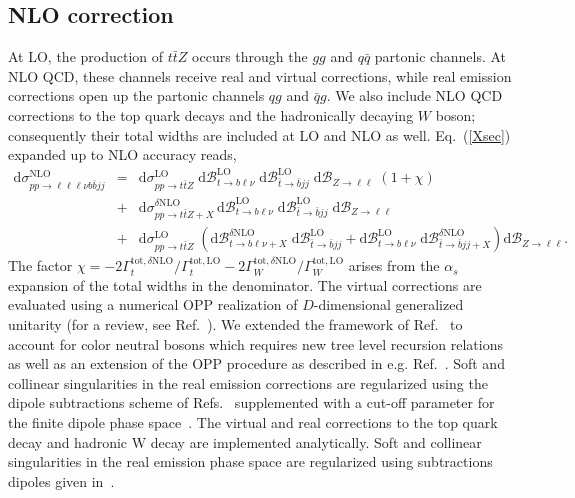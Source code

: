 \documentclass[preprint]{JHEP3} %
\newcommand{\mrm}{\mathrm}
\newcommand{\rd}{\mathrm{d}}
\newcommand{\Br}{\mathcal{B}}
\def\ttbZ{t\bar{t}Z}
\newcommand{\be}{\begin{eqnarray}}
\newcommand{\ee}{\end{eqnarray}}
\begin{document}
\subsection{NLO correction}
At LO, the production of $\ttbZ$ occurs through the $gg$ and $q\bar{q}$ partonic channels. 
At NLO QCD, these channels receive real and virtual corrections, while real emission corrections open up the partonic channels $qg$ and $\bar{q}g$. 
We also include NLO QCD corrections to the top quark decays and the hadronically decaying $W$ boson; consequently their total widths are included at LO and NLO as well.
Eq.~(\ref{Xsec}) expanded up to NLO accuracy reads,
\be
 \rd \sigma_{pp\to\ell\ell\ell\nu b \bar{b} jj}^\mrm{NLO} &=& 
 \rd \sigma_{pp\to\ttbZ}^\mrm{LO} \; \rd\Br_{t\to b \ell\nu}^\mrm{LO} \; \rd\Br_{\bar{t} \to \bar{b} jj}^\mrm{LO} \; \rd\Br_{Z\to \ell\ell}
 \; \left( 1 + \chi \right)
\nonumber \\
 &+&   \rd \sigma_{pp\to\ttbZ+X}^{\delta \mrm{NLO}}  \, \rd\Br_{t\to b \ell\nu}^\mrm{LO} \; \rd\Br_{\bar{t} \to \bar{b} jj}^\mrm{LO} \; \rd\Br_{Z\to \ell\ell}
\nonumber \\
 &+&  \rd \sigma_{pp\to\ttbZ}^\mrm{LO} \; \left(  \rd\Br_{t\to b \ell\nu+X}^{\delta\mrm{NLO}} \; \rd\Br_{\bar{t} \to \bar{b} jj}^\mrm{LO} + \rd\Br_{t\to b \ell\nu}^\mrm{LO} \; \rd\Br_{\bar{t} \to \bar{b} jj+X}^{\delta\mrm{NLO}} \right) \rd\Br_{Z\to \ell\ell}
. \label{XsecNLO}
\ee
The factor $\chi= -2 \Gamma_t^{\mrm{tot},\delta\mrm{NLO}}/\Gamma_t^{\mrm{tot,LO}} -2 \Gamma_W^{\mrm{tot},\delta\mrm{NLO}}/\Gamma_W^{\mrm{tot,LO}} $ arises from the $\alpha_s$ expansion
of the total widths in the denominator.
The virtual corrections are evaluated using a numerical OPP realization \cite{Ossola:2006} of $D$-dimensional generalized unitarity \cite{Ellis:2007br,Giele:2008ve,Ellis:2008ir} (for a review, see Ref.~\cite{Ellis:2011}).
We extended the framework of Ref.~\cite{Melnikov:2009dn} to account for color neutral bosons which requires new tree level recursion relations as well as an extension of the OPP procedure as described in e.g. Ref.~\cite{}.
Soft and collinear singularities in the real emission corrections are regularized using the dipole subtractions scheme of Refs.~\cite{Catani:1996vz,Catani:2002hc} supplemented with a cut-off parameter for the
finite dipole phase space~\cite{Nagy:2003tz,Nagy:2003tz,copy from ttbphoton paper}.
The virtual and real corrections to the top quark decay and hadronic W decay are implemented analytically. 
Soft and collinear singularities in the real emission phase space are regularized using subtractions dipoles given in~\cite{see ttbphoton paper}.
\end{document}
